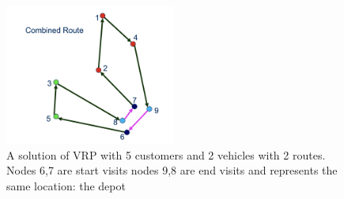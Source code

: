 \begin{figure}[h]
    \centering
    \includegraphics[width=0.5\textwidth]{images/combined-route-solution.png}
    \caption{A solution of VRP with 5 customers and 2 vehicles with 2 routes. Nodes 6,7 are start visits nodes 9,8 are end visits and represents the same location: the depot}
    \label{fig:mesh1}
\end{figure}


